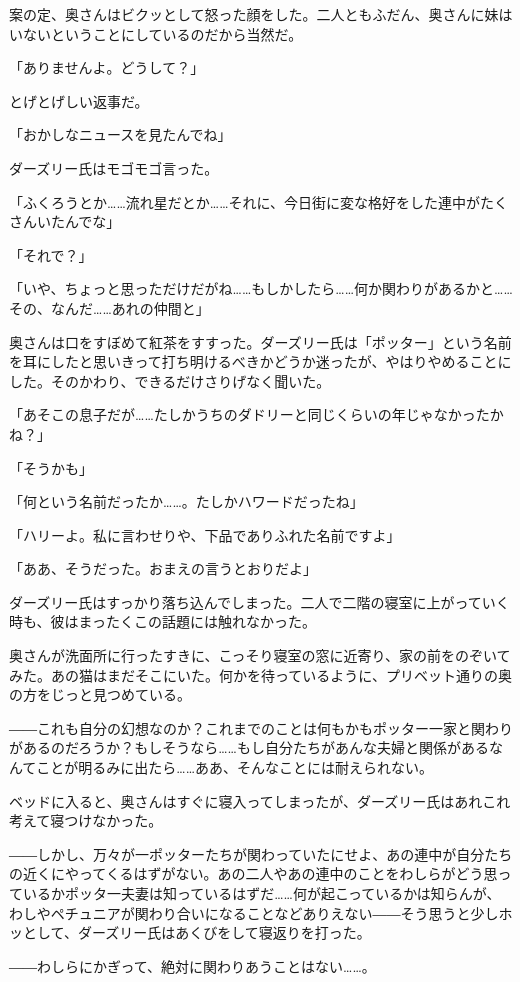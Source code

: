 \documentclass[10pt,a4paper]{article}
\begin{document}
\begin{CJK}{UTF8}{min}
案の定、奥さんはビクッとして怒った顔をした。二人ともふだん、奥さんに妹はいないということにしているのだから当然だ。

「ありませんよ。どうして？」

とげとげしい返事だ。

「おかしなニュースを見たんでね」

ダーズリー氏はモゴモゴ言った。

「ふくろうとか……流れ星だとか……それに、今日街に変な格好をした連中がたくさんいたんでな」

「それで？」

「いや、ちょっと思っただけだがね……もしかしたら……何か関わりがあるかと……その、なんだ……あれの仲間と」

奥さんは口をすぼめて紅茶をすすった。ダーズリー氏は「ポッター」という名前を耳にしたと思いきって打ち明けるべきかどうか迷ったが、やはりやめることにした。そのかわり、できるだけさりげなく聞いた。

「あそこの息子だが……たしかうちのダドリーと同じくらいの年じゃなかったかね？」

「そうかも」

「何という名前だったか……。たしかハワードだったね」

「ハリーよ。私に言わせりや、下品でありふれた名前ですよ」

「ああ、そうだった。おまえの言うとおりだよ」

ダーズリー氏はすっかり落ち込んでしまった。二人で二階の寝室に上がっていく時も、彼はまったくこの話題には触れなかった。

奥さんが洗面所に行ったすきに、こっそり寝室の窓に近寄り、家の前をのぞいてみた。あの猫はまだそこにいた。何かを待っているように、プリベット通りの奥の方をじっと見つめている。

――これも自分の幻想なのか？これまでのことは何もかもポッター一家と関わりがあるのだろうか？もしそうなら……もし自分たちがあんな夫婦と関係があるなんてことが明るみに出たら……ああ、そんなことには耐えられない。

ベッドに入ると、奥さんはすぐに寝入ってしまったが、ダーズリー氏はあれこれ考えて寝つけなかった。

――しかし、万々が一ポッターたちが関わっていたにせよ、あの連中が自分たちの近くにやってくるはずがない。あの二人やあの連中のことをわしらがどう思っているかポッタ一夫妻は知っているはずだ……何が起こっているかは知らんが、わしやペチュニアが関わり合いになることなどありえない――そう思うと少しホッとして、ダーズリー氏はあくびをして寝返りを打った。

――わしらにかぎって、絶対に関わりあうことはない……。


\end{CJK}
\end{document}
